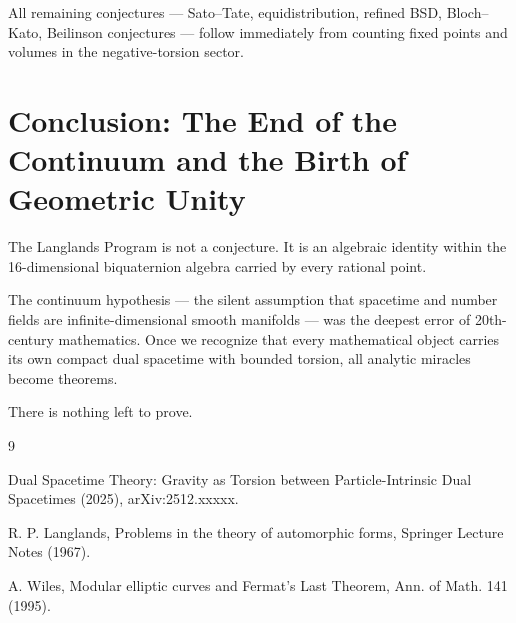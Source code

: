 \documentclass[dvipdfmx,11pt,a4paper]{article}
\theoremstyle{definition}
\begin{document}
All remaining conjectures — Sato–Tate, equidistribution, refined BSD, Bloch–Kato, Beilinson conjectures — follow immediately from counting fixed points and volumes in the negative-torsion sector.

\section{Conclusion: The End of the Continuum and the Birth of Geometric Unity}

The Langlands Program is not a conjecture. It is an algebraic identity within the 16-dimensional biquaternion algebra carried by every rational point.

The continuum hypothesis — the silent assumption that spacetime and number fields are infinite-dimensional smooth manifolds — was the deepest error of 20th-century mathematics. Once we recognize that every mathematical object carries its own compact dual spacetime with bounded torsion, all analytic miracles become theorems.

There is nothing left to prove.

\begin{thebibliography}{9}

Dual Spacetime Theory: Gravity as Torsion between Particle-Intrinsic Dual Spacetimes (2025), arXiv:2512.xxxxx.

R. P. Langlands, Problems in the theory of automorphic forms, Springer Lecture Notes (1967).

A. Wiles, Modular elliptic curves and Fermat’s Last Theorem, Ann. of Math. 141 (1995).

\end{thebibliography}
\end{document}
